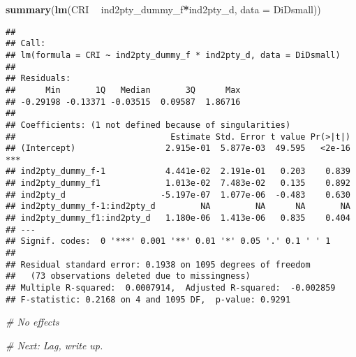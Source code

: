 \documentclass[]{article}
\newenvironment{Shaded}{\begin{snugshade}}{\end{snugshade}}
\newcommand{\KeywordTok}[1]{\textcolor[rgb]{0.13,0.29,0.53}{\textbf{#1}}}
\newcommand{\DataTypeTok}[1]{\textcolor[rgb]{0.13,0.29,0.53}{#1}}
\newcommand{\StringTok}[1]{\textcolor[rgb]{0.31,0.60,0.02}{#1}}
\newcommand{\CommentTok}[1]{\textcolor[rgb]{0.56,0.35,0.01}{\textit{#1}}}
\newcommand{\OperatorTok}[1]{\textcolor[rgb]{0.81,0.36,0.00}{\textbf{#1}}}
\newcommand{\NormalTok}[1]{#1}
\begin{document}
\begin{Shaded}
\begin{Highlighting}[]
\KeywordTok{summary}\NormalTok{(}\KeywordTok{lm}\NormalTok{(CRI }\OperatorTok{~}\StringTok{ }\NormalTok{ind2pty_dummy_f}\OperatorTok{*}\NormalTok{ind2pty_d, }\DataTypeTok{data =}\NormalTok{ DiDsmall))}
\end{Highlighting}
\end{Shaded}

\begin{verbatim}
## 
## Call:
## lm(formula = CRI ~ ind2pty_dummy_f * ind2pty_d, data = DiDsmall)
## 
## Residuals:
##      Min       1Q   Median       3Q      Max 
## -0.29198 -0.13371 -0.03515  0.09587  1.86716 
## 
## Coefficients: (1 not defined because of singularities)
##                               Estimate Std. Error t value Pr(>|t|)    
## (Intercept)                  2.915e-01  5.877e-03  49.595   <2e-16 ***
## ind2pty_dummy_f-1            4.441e-02  2.191e-01   0.203    0.839    
## ind2pty_dummy_f1             1.013e-02  7.483e-02   0.135    0.892    
## ind2pty_d                   -5.197e-07  1.077e-06  -0.483    0.630    
## ind2pty_dummy_f-1:ind2pty_d         NA         NA      NA       NA    
## ind2pty_dummy_f1:ind2pty_d   1.180e-06  1.413e-06   0.835    0.404    
## ---
## Signif. codes:  0 '***' 0.001 '**' 0.01 '*' 0.05 '.' 0.1 ' ' 1
## 
## Residual standard error: 0.1938 on 1095 degrees of freedom
##   (73 observations deleted due to missingness)
## Multiple R-squared:  0.0007914,  Adjusted R-squared:  -0.002859 
## F-statistic: 0.2168 on 4 and 1095 DF,  p-value: 0.9291
\end{verbatim}

\begin{Shaded}
\begin{Highlighting}[]
\CommentTok{# No effects }

\CommentTok{# Next: Lag, write up. }
\end{Highlighting}
\end{Shaded}
\end{document}
